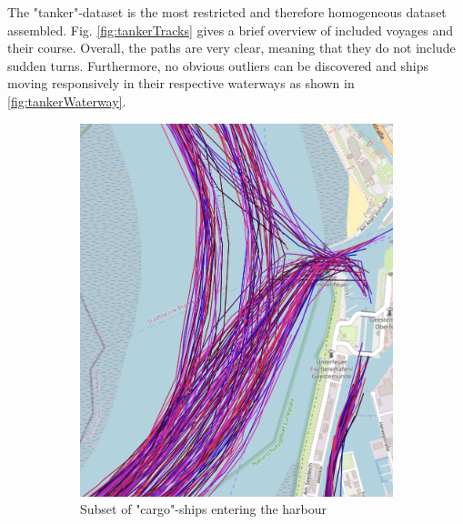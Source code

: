 The "tanker"-dataset is the most restricted and therefore homogeneous dataset assembled. Fig. \ref{fig:tankerTracks} gives a brief overview of included voyages and their course.
Overall, the paths are very clear, meaning that they do not include sudden turns. Furthermore, no obvious outliers can be discovered and ships moving responsively in their respective waterways as shown in \ref{fig:tankerWaterway}.

\begin{figure}[H]
     \centering
     \begin{subfigure}[b]{0.48\textwidth}
         \centering
        \includegraphics[width=\textwidth]{images/ais/tracks/cargo_entering_fary.png}
         \caption{Subset of "cargo"-ships entering the harbour}
     \end{subfigure}
     \hfill
     \begin{subfigure}[b]{0.48\textwidth}
         \centering

\end{subfigure}
\end{figure}
